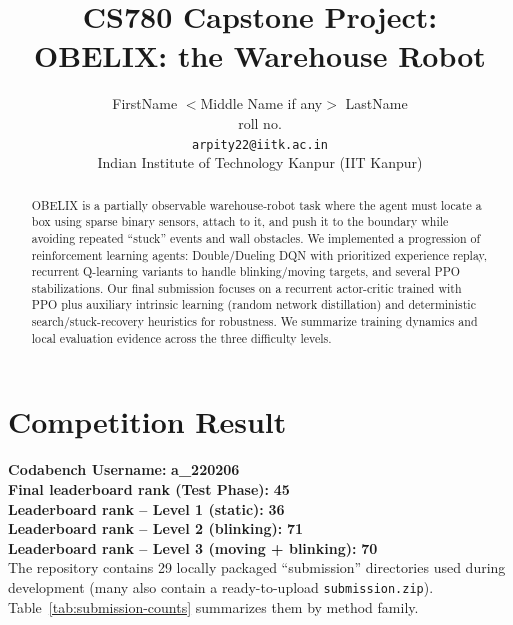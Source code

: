 \documentclass[11pt, oneside]{article}    %
\title{CS780 Capstone Project: \\
OBELIX: the Warehouse Robot
}
\author{
    FirstName $<$Middle Name if any$>$ LastName  \\ 
    roll no.\\
    {\tt arpity22@iitk.ac.in}\\
    {Indian Institute of Technology Kanpur (IIT Kanpur)}
}
\date{}
\begin{document}
\maketitle

\begin{abstract}
OBELIX is a partially observable warehouse-robot task where the agent must locate a box using sparse binary sensors, attach to it, and push it to the boundary while avoiding repeated ``stuck'' events and wall obstacles. We implemented a progression of reinforcement learning agents: Double/Dueling DQN with prioritized experience replay, recurrent Q-learning variants to handle blinking/moving targets, and several PPO stabilizations. Our final submission focuses on a recurrent actor-critic trained with PPO plus auxiliary intrinsic learning (random network distillation) and deterministic search/stuck-recovery heuristics for robustness. We summarize training dynamics and local evaluation evidence across the three difficulty levels.
\end{abstract}

\section{Competition Result}
\textbf{Codabench Username:} \textbf{a\_220206} \\
\textbf{Final leaderboard rank (Test Phase):} \textbf{45} \\
\textbf{Leaderboard rank -- Level 1 (static):} \textbf{36} \\
\textbf{Leaderboard rank -- Level 2 (blinking):} \textbf{71} \\
\textbf{Leaderboard rank -- Level 3 (moving + blinking):} \textbf{70} \\

The repository contains 29 locally packaged ``submission'' directories used during development (many also contain a ready-to-upload \texttt{submission.zip}). Table~\ref{tab:submission-counts} summarizes them by method family.
\end{document}
